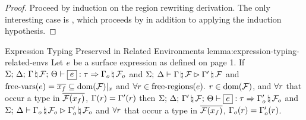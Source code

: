 \begin{proof}
  Proceed by induction on the region rewriting derivation. The only interesting
  case is , which proceeds by
   in addition to applying the induction
  hypothesis.
\end{proof}

\begin{oxlemma}{Expression Typing Preserved in Related Environments}
  {lemma:expression-typing-related-envs} Let $e$ be a surface expression
  as defined on page 1. If
  $\oxtypjudge{\oxglobalctx}{\oxtvarctx}{\oxkontctx}{\oxnewframe{\oxvarctx}{\oxframe}}
  {\oxexpr}{\oxtype}{\oxnewframe{\oxvarctx_o}{\oxframe_o}}$ and
  $\Sigma; \: \Delta \vdash \Gamma \, \natural \, \mathcal{F} \rhd \Gamma^\prime \, \natural \, \mathcal{F}$ and $\textrm{free-vars}(e) =
  \overline{x_f} \subseteq \textrm{dom}(\mathcal{F})|_x$ and $\forall r
  \in \textrm{free-regions}(e).$ $r \in \textrm{dom}(\mathcal{F})$, and $\forall
  r$ that occur a type in $\overline{\mathcal{F}(x_f)}$,
  $\Gamma(r) = \Gamma^\prime(r)$ then
  $\oxtypjudge{\oxglobalctx}{\oxtvarctx}{\oxkontctx}{\oxnewframe{\oxvarctx^\prime}{\oxframe}}
  {\oxexpr}{\oxtype}{\oxnewframe{\oxvarctx_o^\prime}{\oxframe_o}}$ and
  $\Sigma; \: \Delta \vdash \Gamma_o \, \natural \, \mathcal{F}_o \rhd \Gamma_o^\prime \, \natural \, \mathcal{F}_o$ and $\forall r$ that
  occur a type in $\overline{\mathcal{F}(x_f)}$, $\Gamma_o(r) =
  \Gamma_o^\prime(r)$.
\end{oxlemma}
